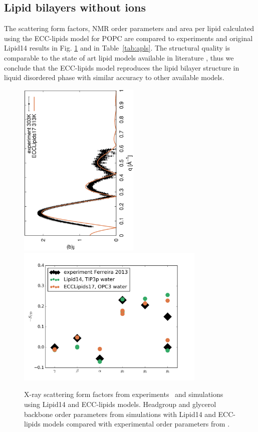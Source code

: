 \documentclass[aip,jcp,twocolumn]{revtex4}
\begin{document}
\subsection{Lipid bilayers without ions}
The scattering form factors, NMR order parameters and area per lipid calculated  
using the ECC-lipids model for POPC are compared to experiments and original
Lipid14 results in Fig. \ref{simVSexpNOions} and in Table~\ref{tab:apls}. 
The structural quality is comparable to the state of art lipid models available in literature \cite{ollila16},
thus we conclude that the ECC-lipids model reproduces the lipid bilayer structure
in liquid disordered phase with similar accuracy to other available models. 

\begin{figure}[]
  \centering
  \includegraphics[height=8.5cm,angle=-90]{../Fig/form-f_exp-l14-eccl17.eps}
  \includegraphics[width=9.0cm]{../Fig/ipython_nb/Headgr_OPs_exp-L14-ECCL17.png}
  \caption{\label{simVSexpNOions}
    X-ray scattering form factors from experiments~\cite{Kucerka2011} and simulations using Lipid14 \cite{dickson14} and ECC-lipids models. 
    Headgroup and glycerol backbone order parameters from simulations with Lipid14 \cite{dickson14} and ECC-lipids models
    compared with experimental order parameters from \cite{ferreira13}.}
\end{figure}
\end{document}
